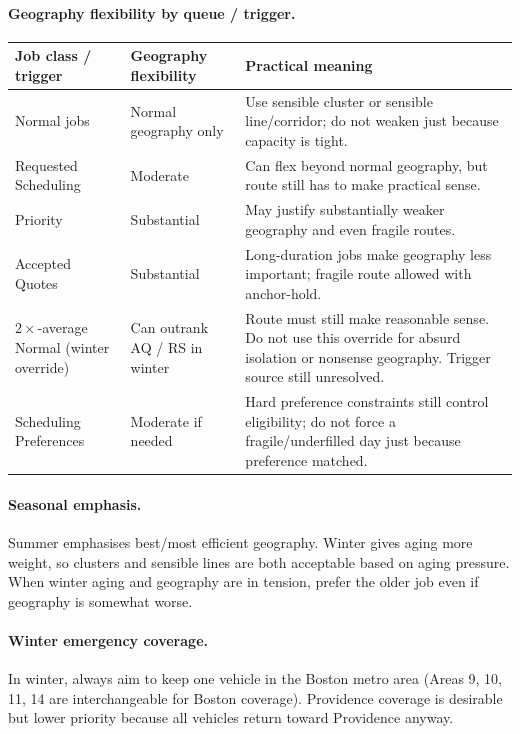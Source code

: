 \documentclass[12pt]{article}
\begin{document}
\paragraph{Geography flexibility by queue / trigger.}

\medskip
{\small
\begin{longtable}{lp{3.5cm}p{6cm}}
\toprule
\textbf{Job class / trigger} & \textbf{Geography flexibility} & \textbf{Practical meaning} \\
\midrule
Normal jobs           & Normal geography only & Use sensible cluster or sensible line/corridor; do not weaken just because capacity is tight. \\
Requested Scheduling  & Moderate & Can flex beyond normal geography, but route still has to make practical sense. \\
Priority              & Substantial & May justify substantially weaker geography and even fragile routes. \\
Accepted Quotes       & Substantial & Long-duration jobs make geography less important; fragile route allowed with anchor-hold. \\
$2\times$-average Normal (winter override) & Can outrank AQ / RS in winter & Route must still make reasonable sense.  Do not use this override for absurd isolation or nonsense geography.  Trigger source still unresolved. \\
Scheduling Preferences & Moderate if needed & Hard preference constraints still control eligibility; do not force a fragile/underfilled day just because preference matched. \\
\bottomrule
\end{longtable}
}

\paragraph{Seasonal emphasis.}
Summer emphasises best/most efficient geography.
Winter gives aging more weight, so clusters and sensible lines are both acceptable based on aging pressure.
When winter aging and geography are in tension, prefer the older job even if geography is somewhat worse.

\paragraph{Winter emergency coverage.}
In winter, always aim to keep one vehicle in the Boston metro area (Areas 9, 10, 11, 14 are interchangeable for Boston coverage).
Providence coverage is desirable but lower priority because all vehicles return toward Providence anyway.
\end{document}
